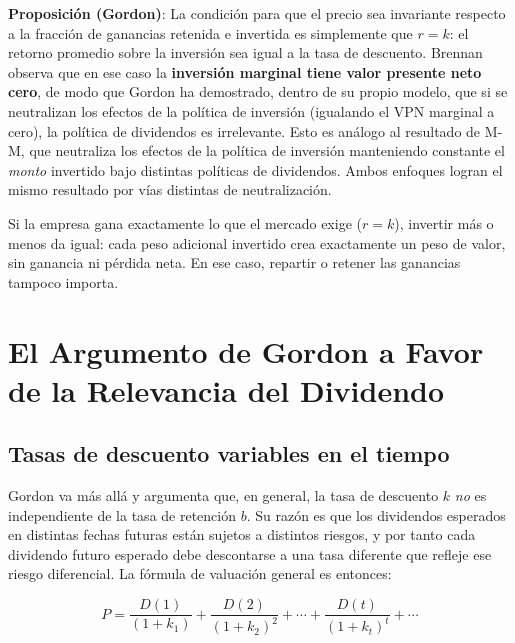 \documentclass[12pt]{article}
\begin{document}
\begin{explicacion}
\textbf{Proposici\'on (Gordon)}: La condici\'on para que el precio sea invariante respecto a la fracci\'on de ganancias retenida e invertida es simplemente que $r = k$: el retorno promedio sobre la inversi\'on sea igual a la tasa de descuento. Brennan observa que en ese caso la \textbf{inversi\'on marginal tiene valor presente neto cero}, de modo que Gordon ha demostrado, dentro de su propio modelo, que si se neutralizan los efectos de la pol\'itica de inversi\'on (igualando el VPN marginal a cero), la pol\'itica de dividendos es irrelevante. Esto es an\'alogo al resultado de M-M, que neutraliza los efectos de la pol\'itica de inversi\'on manteniendo constante el \textit{monto} invertido bajo distintas pol\'iticas de dividendos. Ambos enfoques logran el mismo resultado por v\'ias distintas de neutralizaci\'on.
\end{explicacion}

\begin{intuicion}
Si la empresa gana exactamente lo que el mercado exige ($r = k$), invertir m\'as o menos da igual: cada peso adicional invertido crea exactamente un peso de valor, sin ganancia ni p\'erdida neta. En ese caso, repartir o retener las ganancias tampoco importa.
\end{intuicion}

\section{El Argumento de Gordon a Favor de la Relevancia del Dividendo}

\subsection{Tasas de descuento variables en el tiempo}

Gordon va m\'as all\'a y argumenta que, en general, la tasa de descuento $k$ \textit{no} es independiente de la tasa de retenci\'on $b$. Su raz\'on es que los dividendos esperados en distintas fechas futuras est\'an sujetos a distintos riesgos, y por tanto cada dividendo futuro esperado debe descontarse a una tasa diferente que refleje ese riesgo diferencial. La f\'ormula de valuaci\'on general es entonces:

\[
P = \frac{D(1)}{(1+k_1)} + \frac{D(2)}{(1+k_2)^2} + \cdots + \frac{D(t)}{(1+k_t)^t} + \cdots
\]
\end{document}
